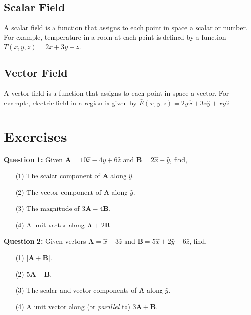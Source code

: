 \documentclass[12pt,a4paper]{article}
\begin{document}
\subsection{Scalar Field}
A scalar field is a function that assigns to each point in space a scalar or number. For example, temperature in a room at each point is defined by a function $T(x, y, z)=2x+3y-z$.
\subsection{Vector Field}
A vector field is a function that assigns to each point in space a vector. For example, electric field in a region is given by $\bar{E}(x, y, z)=2y\hat{x}+3z\hat{y}+xy\hat{z}$.
\section{Exercises}
\noindent\textbf{Question 1:} Given $\textbf{A}=10\hat x-4\hat y+6\hat z$ and $\textbf{B}=2\hat x+\hat y$, find,
\begin{enumerate}
\item[(1)] The scalar component of \textbf{A} along $\hat y$.
\item[(2)] The vector component of \textbf{A} along $\hat y$.
\item[(3)] The magnitude of $3\textbf{A}-4\textbf{B}$.
\item[(4)] A unit vector along $\textbf{A}+2\textbf{B}$
\end{enumerate}
\noindent\textbf{Question 2:} Given vectors $\textbf{A}=\hat x+3\hat z$ and $\textbf{B}=5\hat x+2\hat y-6\hat z$, find,
\begin{enumerate}
\item[(1)] $|\textbf{A}+\textbf{B}|$.
\item[(2)] $5\textbf{A}-\textbf{B}$.
\item[(3)] The scalar and vector components of \textbf{A} along $\hat y$.
\item[(4)] A unit vector along (or \textit{parallel} to) $3\textbf{A}+\textbf{B}$.
\end{enumerate}


\end{document}
